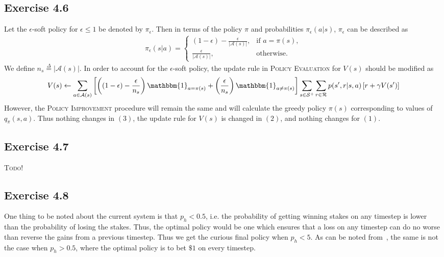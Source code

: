 \documentclass[10pt]{article}
\newcommand{\ldef}{\stackrel{\Delta}{=}}
\begin{document}
 	\subsection*{Exercise 4.6}
 	\label{ss:4.6}
 	Let the $\epsilon$-soft policy for $\epsilon \leq 1$ be denoted by $\pi_\epsilon$. Then in terms of the policy $\pi$ and probabilities $\pi_\epsilon(a|s)$, $\pi_\epsilon$ can be described as
 	\begin{align}
 	\pi_\epsilon(s|a) = \begin{cases}
 	(1-\epsilon) - \frac{\epsilon}{|\mathcal{A}(s)|},& \text{if } a = \pi(s),\\
 	\frac{\epsilon}{|\mathcal{A}(s)|}, & \text{otherwise}.
 	\end{cases}
 	\end{align}
 	We define $n_s\ldef |\mathcal{A}(s)|$. In order to account for the $\epsilon$-soft policy, the update rule in \textsc{Policy Evaluation} for $V(s)$ should be modified as
 	\begin{align*}
 	V(s) \leftarrow \sum_{a\in\mathcal{A}(s)} \left[ \left( (1-\epsilon) - \frac{\epsilon}{n_s} \right) \mathbbm{1}_{ a= \pi(s)}+ \left( \frac{\epsilon}{n_s} \right) \mathbbm{1}_{a\neq\pi(s)} \right] \sum_{s\in\statesp}\sum_{r\in\rewardsp} p(s',r|s,a) \left[r + \gamma V(s') \right]
 	\end{align*}
 	However, the \textsc{Policy Improvement} procedure will remain the same and will calculate the greedy policy $\pi(s)$ corresponding to values of $q_\pi(s,a)$. Thus nothing changes in $(3)$, the update rule for $V(s)$ is changed in $(2)$, and nothing changes for $(1)$.
 	\subsection*{Exercise 4.7}
 	\label{ss:4.7}
 	{\large\textsc{Todo!}}
 	\subsection*{Exercise 4.8}
 	\label{ss:4.8}
 	One thing to be noted about the current system is that $p_h<0.5$, i.e. the probability of getting winning stakes on any timestep is lower than the probability of losing the stakes. Thus, the optimal policy would be one which ensures that a loss on any timestep can do no worse than reverse the gains from a previous timestep. Thus we get the curious final policy when $p_h<5$. As can be noted from~, the same is not the case when $p_h>0.5$, where the optimal policy is to bet $\$ 1$ on every timestep.
\end{document}
